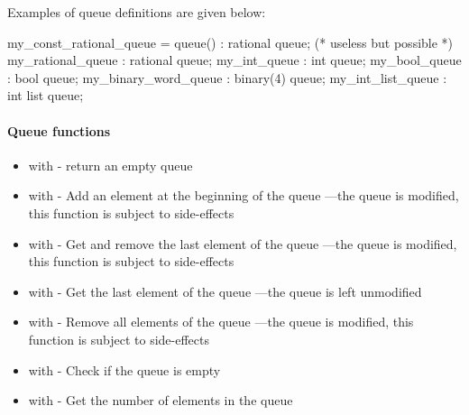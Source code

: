 Examples of queue definitions are given below:

\begin{IMITATORmodel}
	my_const_rational_queue = queue() : rational queue; (* useless but possible *)
	my_rational_queue			: rational queue;
	my_int_queue					: int queue;
	my_bool_queue        	: bool queue;
	my_binary_word_queue 	: binary(4) queue;
	my_int_list_queue     : int list queue;
\end{IMITATORmodel}


\paragraph{Queue functions}

\begin{itemize}
	\item {} with  - return an empty queue
	\item \label{item:lbl-queue_push}  with  - Add an element  at the beginning of the queue ---the queue is modified, this function is subject to side-effects
	\item \label{item:lbl-queue_pop}  with  - Get and remove the last element of the queue ---the queue is modified, this function is subject to side-effects
	\item \label{item:lbl-queue_top}  with  - Get the last element of the queue ---the queue is left unmodified
	\item \label{item:lbl-queue_clear}  with  - Remove all elements of the queue ---the queue is modified, this function is subject to side-effects
	\item \label{item:lbl-queue_is_empty}  with  - Check if the queue  is empty
	\item \label{item:lbl-queue_length}  with  - Get the number of elements in the queue 
\end{itemize}

